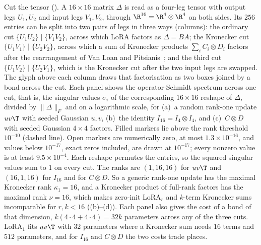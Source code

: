 Cut the tensor (). A $16\times16$ matrix $\Delta$ is read as a four-leg tensor with output legs
$U_1,U_2$ and input legs $V_1,V_2$, through $\R^{16}=\R^4\otimes\R^4$ on both sides. Its $256$ entries can be split into
two pairs of legs in three ways (columns): the ordinary cut $\{U_1U_2\}\mid\{V_1V_2\}$, across which LoRA factors as
$\Delta=BA$; the Kronecker cut $\{U_1V_1\}\mid\{U_2V_2\}$, across which a sum of Kronecker products $\sum_iC_i\otimes
D_i$ factors after the rearrangement of Van Loan and Pitsianis~\citeyearpar{loan1993approximation}; and the third cut
$\{U_1V_2\}\mid\{U_2V_1\}$, which is the Kronecker cut after the two input legs are swapped. The glyph above each column
draws that factorisation as two boxes joined by a bond across the cut. Each panel shows the operator-Schmidt spectrum
across one cut, that is, the singular values $\sigma_i$ of the corresponding $16\times16$ reshape of $\Delta$, divided by
$\lVert\Delta\rVert_F$ and on a logarithmic scale, for (a)~a random rank-one update $uv\T$ with seeded Gaussian $u,v$,
(b)~the identity $I_{16}=I_4\otimes I_4$, and (c)~$C\otimes D$ with seeded Gaussian $4\times4$ factors. Filled markers lie
above the rank threshold $10^{-10}$ (dashed line). Open markers are numerically zero, at most $1.3\times10^{-16}$, and
values below $10^{-17}$, exact zeros included, are drawn at $10^{-17}$; every nonzero value is at least
$9.5\times10^{-4}$. Each reshape permutes the entries, so the squared singular values sum to $1$ on every cut. The ranks
are $(1,16,16)$ for $uv\T$ and $(16,1,16)$ for $I_{16}$ and for $C\otimes D$. So a generic rank-one update has the
maximal Kronecker rank $\kappa_1=16$, and a Kronecker product of full-rank factors has the maximal rank $\nu=16$, which
makes zero-init LoRA$_r$ and $k$-term Kronecker sums incomparable for $r,k<16$ ((b)--(d)). Each
panel also gives the cost of a bond of that dimension, $k(4\cdot4+4\cdot4)=32k$ parameters across any of the three cuts.
LoRA$_1$ fits $uv\T$ with $32$ parameters where a Kronecker sum needs $16$ terms and $512$ parameters, and for $I_{16}$
and $C\otimes D$ the two costs trade places.
